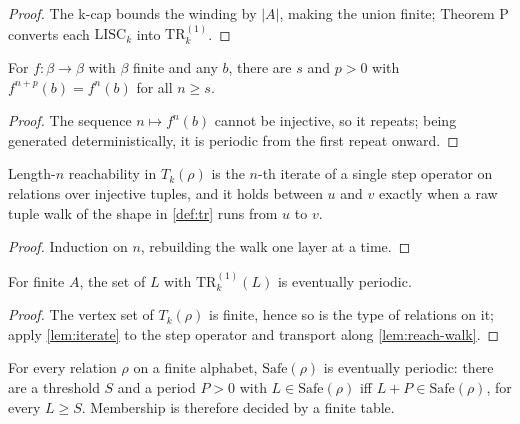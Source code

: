 \begin{proof}
\leanok
{}
The k-cap bounds the winding by $|A|$, making the union finite; Theorem P
converts each $\mathrm{LISC}_k$ into $\mathrm{TR}_k^{(1)}$.
\end{proof}

\begin{lemma}
\label{lem:iterate}
\leanok
For $f : \beta \to \beta$ with $\beta$ finite and any $b$, there are $s$ and
$p > 0$ with $f^{n+p}(b) = f^{n}(b)$ for all $n \geq s$.
\end{lemma}

\begin{proof}
\leanok
The sequence $n \mapsto f^n(b)$ cannot be injective, so it repeats; being
generated deterministically, it is periodic from the first repeat onward.
\end{proof}

\begin{lemma}
\label{lem:reach-walk}
\leanok
{}
Length-$n$ reachability in $T_k(\rho)$ is the $n$-th iterate of a single step
operator on relations over injective tuples, and it holds between $u$ and $v$
exactly when a raw tuple walk of the shape in \ref{def:tr} runs from $u$ to
$v$.
\end{lemma}

\begin{proof}
\leanok
Induction on $n$, rebuilding the walk one layer at a time.
\end{proof}

\begin{lemma}
\label{lem:evper-tr}
\leanok
{}
For finite $A$, the set of $L$ with $\mathrm{TR}_k^{(1)}(L)$ is eventually
periodic.
\end{lemma}

\begin{proof}
\leanok
{}
The vertex set of $T_k(\rho)$ is finite, hence so is the type of relations on
it; apply \ref{lem:iterate} to the step operator and transport along
\ref{lem:reach-walk}.
\end{proof}

\begin{theorem}[Theorem B]
\label{thm:B}
\leanok
{}
For every relation $\rho$ on a finite alphabet, $\mathrm{Safe}(\rho)$ is
eventually periodic: there are a threshold $S$ and a period $P > 0$ with
$L \in \mathrm{Safe}(\rho)$ iff $L+P \in \mathrm{Safe}(\rho)$, for every
$L \geq S$. Membership is therefore decided by a finite table.
\end{theorem}

